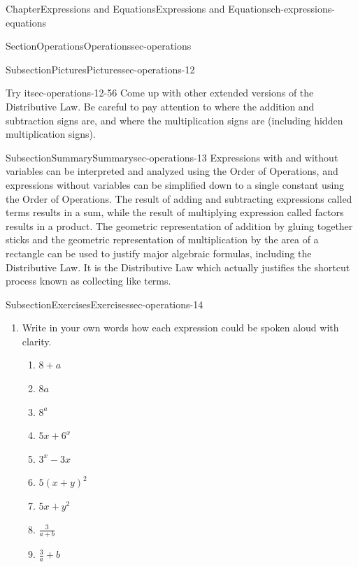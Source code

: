 \documentclass[twoside,11pt,]{book}
\numberwithin{equation}{chapter}
\begin{document}
\begin{chapterptx}{Chapter}{Expressions and Equations}{}{Expressions and Equations}{}{}{ch-expressions-equations}
\begin{sectionptx}{Section}{Operations}{}{Operations}{}{}{sec-operations}
\begin{subsectionptx}{Subsection}{Pictures}{}{Pictures}{}{}{sec-operations-12}
\begin{inlineexercise}{Try it}{}{sec-operations-12-56}
Come up with other extended versions of the Distributive Law. Be careful to pay attention to where the addition and subtraction signs are, and where the multiplication signs are (including hidden multiplication signs).%
\end{inlineexercise}%
\end{subsectionptx}
%
%
\typeout{************************************************}
\typeout{************************************************}
%
\begin{subsectionptx}{Subsection}{Summary}{}{Summary}{}{}{sec-operations-13}
Expressions with and without variables can be interpreted and analyzed using the Order of Operations, and expressions without variables can be simplified down to a single constant using the Order of Operations. The result of adding and subtracting expressions called terms results in a sum, while the result of multiplying expression called factors results in a product. The geometric representation of addition by gluing together sticks and the geometric representation of multiplication by the area of a rectangle can be used to justify major algebraic formulas, including the Distributive Law. It is the Distributive Law which actually justifies the shortcut process known as collecting like terms.%
\end{subsectionptx}
%
%
\typeout{************************************************}
\typeout{************************************************}
%
\begin{subsectionptx}{Subsection}{Exercises}{}{Exercises}{}{}{sec-operations-14}
%
\begin{enumerate}
\item{}Write in your own words how each expression could be spoken aloud with clarity.%
\begin{enumerate}
\item{}\(\displaystyle 8+a\)%
\item{}\(\displaystyle 8a\)%
\item{}\(\displaystyle 8^a\)%
\item{}\(\displaystyle 5x + 6^x\)%
\item{}\(\displaystyle 3^x - 3x\)%
\item{}\(\displaystyle 5(x+y)^2\)%
\item{}\(\displaystyle 5x+y^2\)%
\item{}\(\displaystyle \frac{3}{a+b}\)%
\item{}\(\displaystyle \frac{3}{a}+b\)%
\end{enumerate}

\end{enumerate}
\end{subsectionptx}
\end{sectionptx}
\end{chapterptx}
\end{document}
